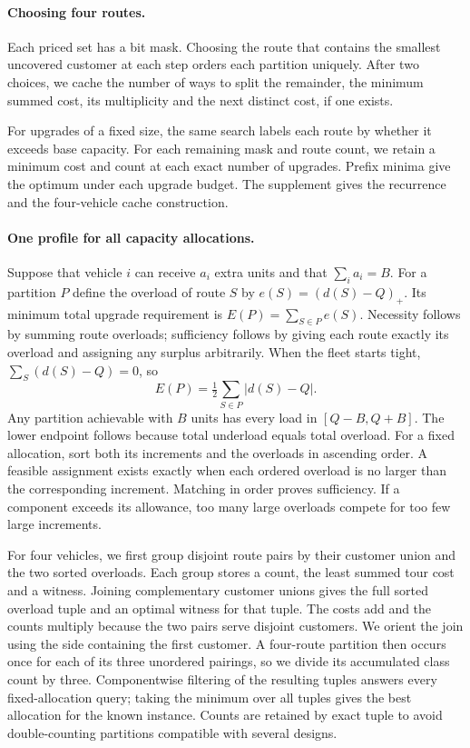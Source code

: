 \documentclass[runningheads]{llncs}
\begin{document}
\paragraph{Choosing four routes.}
Each priced set has a bit mask. Choosing the route that contains the smallest uncovered customer at each step orders each partition uniquely. After two choices, we cache the number of ways to split the remainder, the minimum summed cost, its multiplicity and the next distinct cost, if one exists.

For upgrades of a fixed size, the same search labels each route by whether it exceeds base capacity. For each remaining mask and route count, we retain a minimum cost and count at each exact number of upgrades. Prefix minima give the optimum under each upgrade budget. The supplement gives the recurrence and the four-vehicle cache construction.

\paragraph{One profile for all capacity allocations.}
Suppose that vehicle $i$ can receive $a_i$ extra units and that $\sum_i a_i=B$. For a partition $P$ define the overload of route $S$ by $e(S)=(d(S)-Q)_+$. Its minimum total upgrade requirement is $E(P)=\sum_{S\in P}e(S)$. Necessity follows by summing route overloads; sufficiency follows by giving each route exactly its overload and assigning any surplus arbitrarily. When the fleet starts tight, $\sum_S(d(S)-Q)=0$, so
\[
 E(P)=\tfrac12\sum_{S\in P}|d(S)-Q|.
\]
Any partition achievable with $B$ units has every load in $[Q-B,Q+B]$. The lower endpoint follows because total underload equals total overload. For a fixed allocation, sort both its increments and the overloads in ascending order. A feasible assignment exists exactly when each ordered overload is no larger than the corresponding increment. Matching in order proves sufficiency. If a component exceeds its allowance, too many large overloads compete for too few large increments.

For four vehicles, we first group disjoint route pairs by their customer union and the two sorted overloads. Each group stores a count, the least summed tour cost and a witness. Joining complementary customer unions gives the full sorted overload tuple and an optimal witness for that tuple. The costs add and the counts multiply because the two pairs serve disjoint customers. We orient the join using the side containing the first customer. A four-route partition then occurs once for each of its three unordered pairings, so we divide its accumulated class count by three. Componentwise filtering of the resulting tuples answers every fixed-allocation query; taking the minimum over all tuples gives the best allocation for the known instance. Counts are retained by exact tuple to avoid double-counting partitions compatible with several designs.
\end{document}
